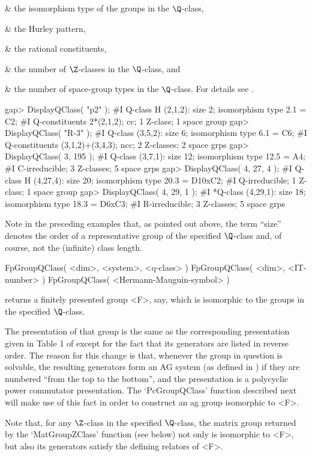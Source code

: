 & \itm the isomorphism type of the groups in the $\Q$-class,

& \itm the Hurley pattern,

& \itm the rational constituents,

& \itm the number of $\Z$-classes in the $\Q$-class, and

& \itm the number of space-group types in the $\Q$-class.
\enditems
For details see \cite{BBNWZ78}.

\beginexample
gap> DisplayQClass( "p2" );
#I   Q-class H (2,1,2): size 2; isomorphism type 2.1 = C2;
#I    Q-constituents 2*(2,1,2); cc; 1 Z-class; 1 space group
gap> DisplayQClass( "R-3" );
#I   Q-class (3,5,2): size 6; isomorphism type 6.1 = C6;
#I    Q-constituents (3,1,2)+(3,4,3); ncc; 2 Z-classes; 2 space grps
gap> DisplayQClass( 3, 195 );
#I   Q-class (3,7,1): size 12; isomorphism type 12.5 = A4;
#I    C-irreducible; 3 Z-classes; 5 space grps
gap> DisplayQClass( 4, 27, 4 );
#I   Q-class H (4,27,4): size 20; isomorphism type 20.3 = D10xC2;
#I    Q-irreducible; 1 Z-class; 1 space group
gap> DisplayQClass( 4, 29, 1 );
#I  *Q-class (4,29,1): size 18; isomorphism type 18.3 = D6xC3;
#I    R-irreducible; 3 Z-classes; 5 space grps
\endexample

Note in the preceding examples that, as pointed out above, the term
``size'' denotes the order of a representative group of the specified
$\Q$-class and, of course, not the (infinite) class length.

\>FpGroupQClass( <dim>, <system>, <q-class> )
\>FpGroupQClass( <dim>, <IT-number> )
\>FpGroupQClass( <Hermann-Mauguin-symbol> )

returns a finitely presented group <F>, say, which is isomorphic to
the groups in the specified $\Q$-class.

The presentation of that group is the same as the corresponding
presentation given in Table 1 of \cite{BBNWZ78} except for the fact
that its generators are listed in reverse order.  The reason for this
change is that, whenever the group in question is solvable, the
resulting generators form an AG system (as defined in {\GAP}) if they
are numbered ``from the top to the bottom'', and the presentation is a
polycyclic power commutator presentation.  The `PcGroupQClass'
function described next will make use of this fact in order to
construct an ag group isomorphic to <F>.

Note that, for any $\Z$-class  in the  specified $\Q$-class,  the  matrix
group  returned by the `MatGroupZClass'  function (see below) not only is
isomorphic to <F>, but also its  generators satisfy the defining relators
of <F>.

